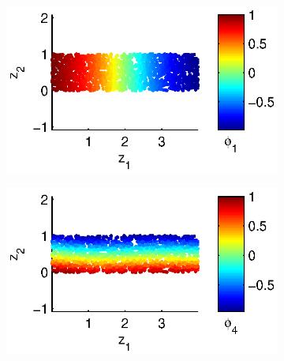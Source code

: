 \documentclass[preprint]{elsarticle}
\begin{document}
\begin{figure}[t]
\centering
\begin{subfigure}{0.45\textwidth}
\includegraphics[width=\textwidth]{strip_discrete1}
\caption{}
\end{subfigure}
%
\begin{subfigure}{0.45\textwidth}
\includegraphics[width=\textwidth]{strip_discrete4}
\caption{}
\end{subfigure}


\end{figure}
\end{document}
